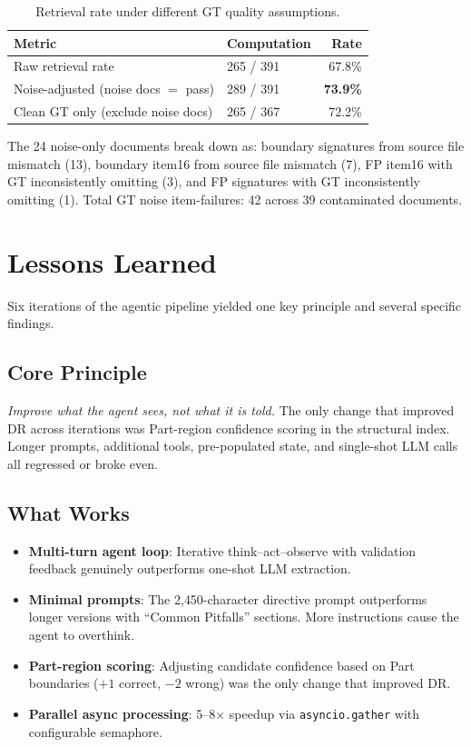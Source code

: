 \documentclass[11pt,a4paper]{article}
\begin{document}
\begin{table}[H]
\centering
\caption{Retrieval rate under different GT quality assumptions.}
\label{tab:adjusted}
\begin{tabular}{llr}
\toprule
\textbf{Metric} & \textbf{Computation} & \textbf{Rate}\\
\midrule
Raw retrieval rate & 265 / 391 & 67.8\%\\
Noise-adjusted (noise docs $=$ pass) & 289 / 391 & \textbf{73.9\%}\\
Clean GT only (exclude noise docs) & 265 / 367 & 72.2\%\\
\bottomrule
\end{tabular}
\end{table}

\noindent
The 24 noise-only documents break down as: boundary signatures from source file mismatch (13), boundary item16 from source file mismatch (7), FP item16 with GT inconsistently omitting (3), and FP signatures with GT inconsistently omitting (1). Total GT noise item-failures: 42 across 39 contaminated documents.


\section{Lessons Learned}\label{sec:lessons}

Six iterations of the agentic pipeline yielded one key principle and several specific findings.

\subsection{Core Principle}

\emph{Improve what the agent sees, not what it is told.} The only change that improved DR across iterations was Part-region confidence scoring in the structural index. Longer prompts, additional tools, pre-populated state, and single-shot LLM calls all regressed or broke even.

\subsection{What Works}

\begin{itemize}[nosep]
    \item \textbf{Multi-turn agent loop}: Iterative think--act--observe with validation feedback genuinely outperforms one-shot LLM extraction.
    \item \textbf{Minimal prompts}: The 2{,}450-character directive prompt outperforms longer versions with ``Common Pitfalls'' sections. More instructions cause the agent to overthink.
    \item \textbf{Part-region scoring}: Adjusting candidate confidence based on Part boundaries ($+1$ correct, $-2$ wrong) was the only change that improved DR.
    \item \textbf{Parallel async processing}: 5--8$\times$ speedup via \texttt{asyncio.gather} with configurable semaphore.
\end{itemize}
\end{document}
